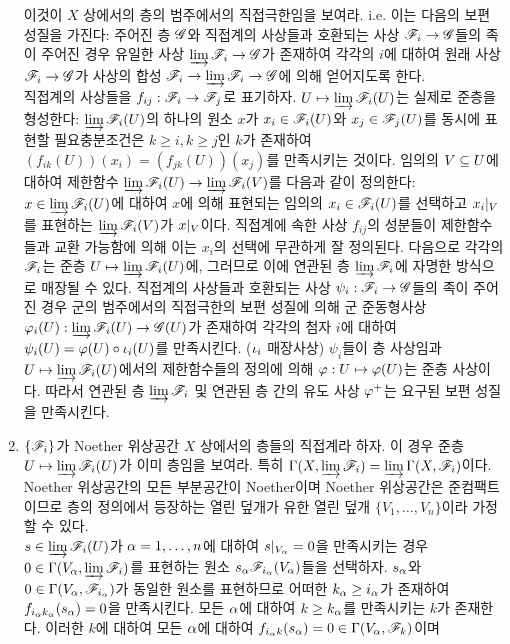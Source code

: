 \begin{enumerate}[label=\tb{1.\arabic*.},itemindent=0mm,itemsep=4mm]
	이것이 $X$ 상에서의 층의 범주에서의 직접극한임을 보여라. i.e. 이는 다음의 보편 성질을 가진다:
	주어진 층 $\mathscr{G}$와 직접계의 사상들과 호환되는 사상 $\mathscr{F}_i\rightarrow\mathscr{G}$들의 족이 주어진 경우
	유일한 사상 $\varinjlim\mathscr{F}_i\rightarrow\mathscr{G}$가 존재하여 각각의 $i$에 대하여 원래 사상 $\mathscr{F}_i\rightarrow\mathscr{G}$가
	사상의 합성 $\mathscr{F}_i\rightarrow\varinjlim\mathscr{F}_i\rightarrow\mathscr{G}$에 의해 얻어지도록 한다.\\
	\sol 직접계의 사상들을 $f_{ij}:\mathscr{F}_i\rightarrow\mathscr{F}_j$로 표기하자. $U\mapsto\varinjlim\mathscr{F}_i(U)$는 실제로 준층을 형성한다:
	$\varinjlim\mathscr{F}_i(U)$의 하나의 원소 $x$가 $x_i\in\mathscr{F}_i(U)$와 $x_j\in\mathscr{F}_j(U)$를 동시에 표현할 필요충분조건은
	$k\ge i,k\ge j$인 $k$가 존재하여 $(f_{ik}(U))(x_i)=(f_{jk}(U))(x_j)$를 만족시키는 것이다.
	임의의 $V\subseteq U$에 대하여 제한함수 $\varinjlim\mathscr{F}_i(U)\rightarrow\varinjlim\mathscr{F}_i(V)$를 다음과 같이 정의한다:
	$x\in\varinjlim\mathscr{F}_i(U)$에 대하여 $x$에 의해 표현되는 임의의 $x_i\in\mathscr{F}_i(U)$를 선택하고
	$x_i|_V$를 표현하는 $\varinjlim\mathscr{F}_i(V)$가 $x|_V$이다.
	직접계에 속한 사상 $f_{ij}$의 성분들이 제한함수들과 교환 가능함에 의해 이는 $x_i$의 선택에 무관하게 잘 정의된다.
	다음으로 각각의 $\mathscr{F}_i$는 준층 $U\mapsto\varinjlim\mathscr{F}_i(U)$에,
	그러므로 이에 연관된 층 $\varinjlim\mathscr{F}_i$에 자명한 방식으로 매장될 수 있다.
	직접계의 사상들과 호환되는 사상 $\psi_i:\mathscr{F}_i\rightarrow\mathscr{G}$들의 족이 주어진 경우
	군의 범주에서의 직접극한의 보편 성질에 의해 군 준동형사상 $\varphi_i(U):\varinjlim\mathscr{F}_i(U)\rightarrow\mathscr{G}(U)$가 존재하여
	각각의 첨자 $i$에 대하여 $\psi_i(U)=\varphi(U)\circ\iota_i(U)$를 만족시킨다. ($\iota_i$ 매장사상)
	$\psi_i$들이 층 사상임과 $U\mapsto\varinjlim\mathscr{F}_i(U)$에서의 제한함수들의 정의에 의해 $\varphi:U\mapsto\varphi(U)$는 준층 사상이다.
	따라서 연관된 층 $\varinjlim\mathscr{F}_i$ 및 연관된 층 간의 유도 사상 $\varphi^+$는 요구된 보편 성질을 만족시킨다.
	\item $\{\mathscr{F}_i\}$가 Noether 위상공간 $X$ 상에서의 층들의 직접계라 하자.
	이 경우 준층 $U\mapsto\varinjlim\mathscr{F}_i(U)$가 이미 층임을 보여라. 특히 $\Gamma(X,\varinjlim\mathscr{F}_i)=\varinjlim\Gamma(X,\mathscr{F}_i)$이다.\\
	\sol Noether 위상공간의 모든 부분공간이 Noether이며 Noether 위상공간은 준컴팩트이므로
	층의 정의에서 등장하는 열린 덮개가 유한 열린 덮개 $\{V_1,\ldots,V_n\}$이라 가정할 수 있다.\\
	$s\in\varinjlim\mathscr{F}_i(U)$가 $\alpha=1,\ldots,n$에 대하여 $s|_{V_\alpha}=0$을 만족시키는 경우
	$0\in\Gamma(V_\alpha,\varinjlim\mathscr{F}_i)$를 표현하는 원소 $s_\alpha\mathscr{F}_{i_\alpha}(V_\alpha)$들을 선택하자.
	$s_\alpha$와 $0\in\Gamma(V_\alpha,\mathscr{F}_{i_\alpha})$가 동일한 원소를 표현하므로 어떠한 $k_\alpha\ge i_\alpha$가 존재하여
	$f_{i_\alpha k_\alpha}(s_\alpha)=0$을 만족시킨다. 모든 $\alpha$에 대하여 $k\ge k_\alpha$를 만족시키는 $k$가 존재한다.
	이러한 $k$에 대하여 모든 $\alpha$에 대하여 $f_{i_\alpha k}(s_\alpha)=0\in\Gamma(V_\alpha,\mathscr{F}_k)$이며

\end{enumerate}
